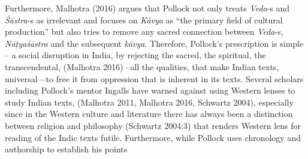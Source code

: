 Furthermore, Malhotra (2016) argues that Pollock not only treats \textsl{Veda}-s and \textsl{Śāstra}-s as irrelevant and focuses on \textsl{Kāvya} as “the primary field of cultural production” but also tries to remove any sacred connection between \textsl{Veda}-s, \textsl{Nāṭyaśāstra} and the subsequent \textsl{kāvya}. Therefore, Pollock’s prescription is simple – a social disruption in India, by rejecting the sacred, the spiritual, the transcendental, (Malhotra 2016) --all the qualities, that make Indian texts, universal---to free it from oppression that is inherent in its texts. Several scholars including Pollock’s mentor Ingalls have warned against using Western lenses to study Indian texts, (Malhotra 2011, Malhotra 2016, Schwartz 2004), especially since in the Western culture and literature there has always been a distinction between religion and philosophy (Schwartz 2004:3) that renders Western lens for reading of the Indic texts futile. Furthermore, while Pollock uses chronology and authorship to establish his points
